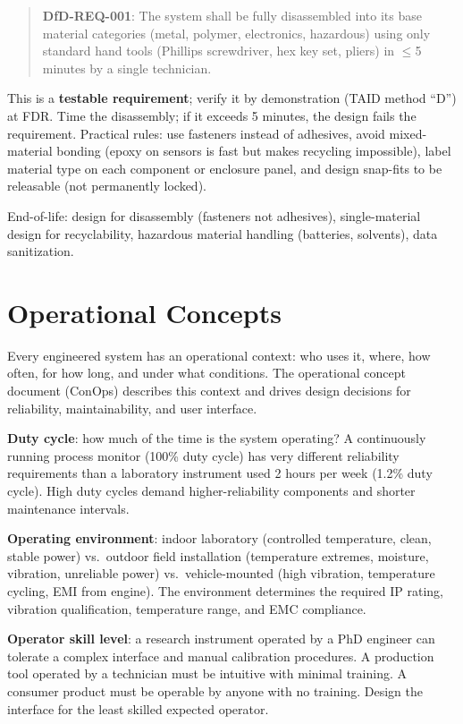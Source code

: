 \begin{quote}
\textbf{DfD-REQ-001}: The system shall be fully disassembled into its base material categories (metal, polymer, electronics, hazardous) using only standard hand tools (Phillips screwdriver, hex key set, pliers) in $\leq$5 minutes by a single technician.
\end{quote}

This is a \textbf{testable requirement}; verify it by demonstration (TAID method ``D'') at FDR. Time the disassembly; if it exceeds 5 minutes, the design fails the requirement. Practical rules: use fasteners instead of adhesives, avoid mixed-material bonding (epoxy on sensors is fast but makes recycling impossible), label material type on each component or enclosure panel, and design snap-fits to be releasable (not permanently locked).

End-of-life: design for disassembly (fasteners not adhesives), single-material design for recyclability, hazardous material handling (batteries, solvents), data sanitization.


\section{Operational Concepts}
Every engineered system has an operational context: who uses it, where, how often, for how long, and under what conditions. The operational concept document (ConOps) describes this context and drives design decisions for reliability, maintainability, and user interface.

\textbf{Duty cycle}: how much of the time is the system operating? A continuously running process monitor (100\% duty cycle) has very different reliability requirements than a laboratory instrument used 2 hours per week (1.2\% duty cycle). High duty cycles demand higher-reliability components and shorter maintenance intervals.

\textbf{Operating environment}: indoor laboratory (controlled temperature, clean, stable power) vs.\ outdoor field installation (temperature extremes, moisture, vibration, unreliable power) vs.\ vehicle-mounted (high vibration, temperature cycling, EMI from engine). The environment determines the required IP rating, vibration qualification, temperature range, and EMC compliance.

\textbf{Operator skill level}: a research instrument operated by a PhD engineer can tolerate a complex interface and manual calibration procedures. A production tool operated by a technician must be intuitive with minimal training. A consumer product must be operable by anyone with no training. Design the interface for the least skilled expected operator.

